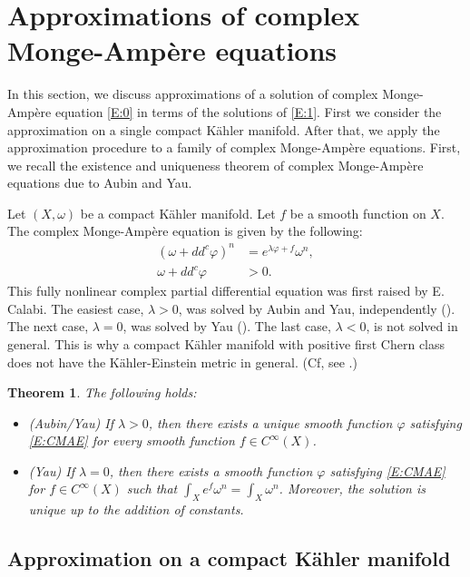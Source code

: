 \documentclass{amsart}
\newtheorem{theorem}{Theorem}[section]
\theoremstyle{definition}
\numberwithin{equation}{section}
\begin{document}
\section{Approximations of complex Monge-Amp\`ere equations}\label{S:approximation}
\label{S:approximation}

In this section, we discuss approximations of a solution of complex Monge-Amp\`ere equation \eqref{E:0} in terms of the solutions of \eqref{E:1}. First we consider the approximation on a single compact K\"ahler manifold. After that, we apply the approximation procedure to a family of complex Monge-Amp\`ere equations. First, we recall the existence and uniqueness theorem of complex Monge-Amp\`ere equations due to Aubin and Yau.

Let $(X,\omega)$ be a compact K\"ahler manifold. Let $f$ be a smooth function on $X$. The complex Monge-Amp\`ere equation is given by the following:
\begin{equation} \label{E:CMAE}
\begin{aligned}
{\left({\omega+dd^c{\varphi}}\right)}^n
&=
e^{\lambda{\varphi}+f}\omega^n,
\\
\omega+dd^c{\varphi}
&>0.
\end{aligned}
\end{equation}
This fully nonlinear complex partial differential equation was first raised by E. Calabi. The easiest case, $\lambda>0$, was solved by Aubin and Yau, independently (\cite{Aubin, Yau}).  The next case, $\lambda=0$, was solved by Yau (\cite{Yau}). The last case, $\lambda<0$, is not solved in general. This is why a compact K\"ahler manifold with positive first Chern class does not have the K\"ahler-Einstein metric in general. (Cf, see \cite{Tian}.)

\begin{theorem} \label{T:AY}
The following holds:
\begin{itemize}
\item [1.] (Aubin/Yau) If $\lambda>0$, then there exists a unique smooth function ${\varphi}$ satisfying \eqref{E:CMAE} for every smooth function $f\in C^\infty(X)$. 
\item [2.] (Yau) If $\lambda=0$, then there exists a smooth function ${\varphi}$ satisfying \eqref{E:CMAE} for $f\in C^\infty(X)$ such that $\int_X e^f\omega^n=\int_X \omega^n$. Moreover, the solution is unique up to the addition of constants.
\end{itemize}
\end{theorem}

\subsection{Approximation on a compact K\"ahler manifold}
\end{document}
